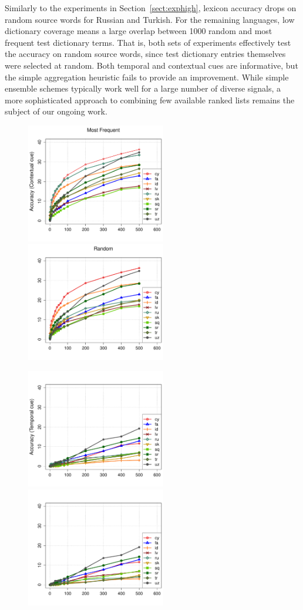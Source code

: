 \documentclass{article}
\newcommand{\mtodo}[1]{}
\newcommand{\secref}[1]{Section~\ref{#1}}
\begin{document}
Similarly to the experiments in \secref{sect:exphigh}, lexicon accuracy drops on random source words for Russian and Turkish.  For the remaining languages, low dictionary coverage means a large overlap between 1000 random and most frequent test dictionary terms.  That is, both sets of experiments effectively test the accuracy on random source words, since test dictionary entries themselves were selected at random. \mtodo{Confusing? Drop most frequent?}  Both temporal and contextual cues are informative, but the simple aggregation heuristic fails to provide an improvement.  While simple ensemble schemes typically work well for a large number of diverse signals, a more sophisticated approach to combining few available ranked lists remains the subject of our ongoing work.\\

\begin{figure}[h!]
\centerline{\mbox{\includegraphics[width=2.4in]{figures/exp3/freq/freqcontext} \includegraphics[width=2.4in]{figures/exp3/rand/randcontext}}}
\centerline{\mbox{\includegraphics[width=2.4in]{figures/exp3/freq/freqtime} \includegraphics[width=2.4in]{figures/exp3/rand/randtime}}}

\end{figure}
\end{document}
